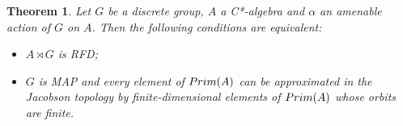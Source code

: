 \documentclass[11 pt, leqno, hidelinks]{amsart}%
\newtheorem{theorem}{Theorem}[section]
\theoremstyle{plain}
\numberwithin{equation}{section}
\newcommand{\Rep}{\textup{Rep}}
\newcommand{\Prim}{\textup{Prim}}
\begin{document}
\begin{theorem} \label{th:maincrossed}
	Let $G$ be a discrete  group, $A$ a C*-algebra and $\alpha$ an amenable action of $G$ on $A$. Then the following conditions are equivalent:
	\begin{itemize}
		\item [(i)] $A\rtimes G$ is RFD;
		\item[(ii)] $G$ is MAP and every element of $\Prim(A)$ can be approximated in the Jacobson topology by finite-dimensional elements of $\Prim(A)$ whose orbits are finite.	
	\end{itemize}
\end{theorem}
\end{document}

